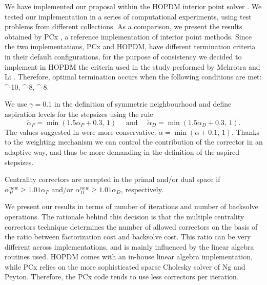 We have implemented our proposal within the HOPDM interior point solver 
\cite{HOPDM}. 
%
%
We tested our implementation in a series of computational 
experiments, using test problems from different collections. 
As a comparison, we present the results obtained by PCx \cite{PCx}, 
a reference implementation of interior point methods. Since the two 
implementations, PCx and HOPDM, have different termination criteria 
in their default configurations, for the purpose of consistency 
we decided to implement in HOPDM the criteria used in the study 
performed by Mehrotra and Li \cite{MehrotraLi}.
Therefore, optimal termination occurs when the following conditions
are met:
%
\be \label{TermCriteria}
 ^{-10}, \qquad
{} ^{-8},  \qquad
{} ^{-8}.
\ee


We use $\gamma = 0.1$ in the definition of symmetric 
neighbourhood and define aspiration levels for the stepsizes using the rule
\[
  \tilde{\alpha}_{P} = \min(1.5 \alpha_{P} \! + \! 0.3, \, 1) 
  \quad \mbox{ and } \quad
  \tilde{\alpha}_{D} = \min(1.5 \alpha_{D} \! + \! 0.3, \, 1). 
\]
The values suggested in \cite{Gondzio96} were more conservative:
$\tilde{\alpha} = \min (\alpha + 0.1, \, 1)$.
Thanks to the weighting mechanism we can control 
the contribution of the corrector in an adaptive way,
and thus be more demanding in the definition of the aspired stepsizes.

Centrality correctors are accepted in the primal and/or dual space
if ${\alpha}_{P}^{new} \geq 1.01 \alpha_{P}$ 
and/or ${\alpha}_{D}^{new} \geq 1.01 \alpha_{D}$, respectively.


We present our results in terms of number of iterations and number 
of backsolve operations. The rationale behind this decision is that 
the multiple centrality correctors technique determines the number 
of allowed correctors on the basis of the ratio between factorization 
cost and backsolve cost. This ratio can be very different across 
implementations, and is mainly influenced by the linear algebra 
routines used. 
HOPDM comes with an in-house linear algebra implementation, while
PCx relies on the more sophisticated sparse Cholesky solver
of Ng and Peyton. Therefore, the PCx code tends to use less 
correctors per iteration.

